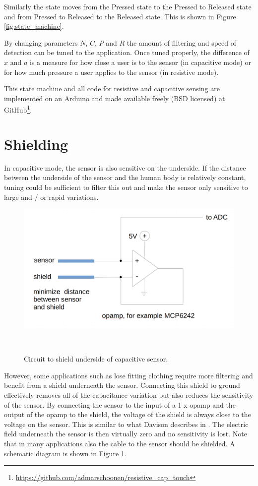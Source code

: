\documentclass{sigchi-ext}
\begin{document}
Similarly the state moves from the Pressed state to the Pressed to Released
state and from Pressed to Released to the Released state. This is shown in Figure \ref{fig:state_machine}.

By changing parameters $N$, $C$, $P$ and $R$ the amount of filtering and
speed of detection can be tuned to the application. Once tuned
properly, the difference of $x$ and $a$ is a measure for how close a user is to
the sensor (in capacitive mode) or for how much pressure a user applies
to the sensor (in resistive mode).

This state machine and all code for resistive and capacitive sensing are
implemented on an Arduino and made available freely (BSD licensed) at
GitHub\footnote{\url{https://github.com/admarschoonen/resistive_cap_touch}}.

\section{Shielding}
In capacitive mode, the sensor is also sensitive on the underside. If
the distance between the underside of the sensor and the human body is
relatively constant, tuning could be sufficient to filter
this out and make the sensor only sensitive to large and / or rapid variations.

\begin{figure}
\centering
\includegraphics[width=0.9\columnwidth]{figures/shield_circuit}
  \caption{Circuit to shield underside of capacitive
sensor.}~\label{fig:shield_circuit}
\end{figure}

However, some applications such as lose fitting clothing require more filtering
and benefit from a shield underneath the
sensor. Connecting this shield to ground effectively removes all of the
capacitance variation but also reduces the sensitivity of the sensor. By
connecting the sensor to the input of a 1 x opamp and the output of the
opamp to the shield, the voltage of the shield is always close to the
voltage on the sensor. This is similar to what Davison describes in
\cite{Davison2013a}. The electric field underneath the sensor is then
virtually zero and no sensitivity is lost. Note that in many applications also
the cable to the sensor should be shielded. A schematic diagram
is shown in Figure \ref{fig:shield_circuit}.
\end{document}
